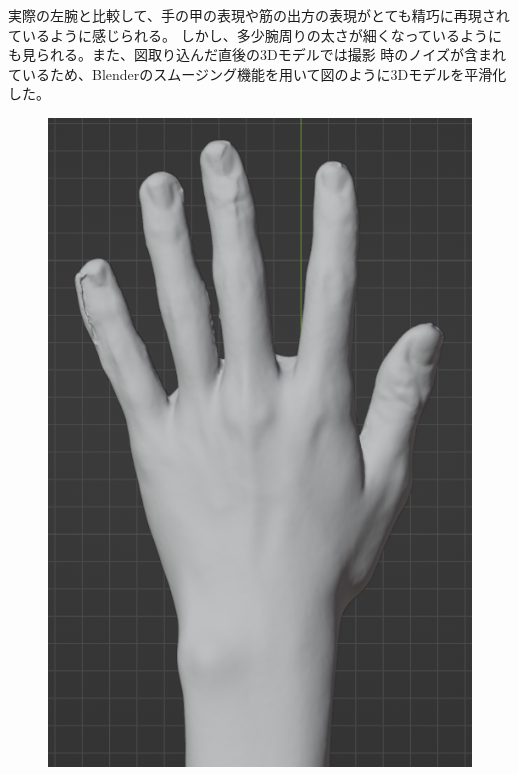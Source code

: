 \documentclass{ltjsreport}
\begin{document}
		\vspace{-10pt}

		実際の左腕と比較して、手の甲の表現や筋の出方の表現がとても精巧に再現されているように感じられる。
		しかし、多少腕周りの太さが細くなっているようにも見られる。また、図取り込んだ直後の3Dモデルでは撮影
		時のノイズが含まれているため、Blenderのスムージング機能を用いて図のように3Dモデルを平滑化した。

		\begin{figure}[H]
		\centering
		\begin{minipage}{0.3\columnwidth}
		\centering
		\includegraphics[width = \columnwidth]{../figs/SmoothingBeforRear.png}
		\label{fig:smoothingbefor}
		\end{minipage}

\end{figure}
\end{document}
